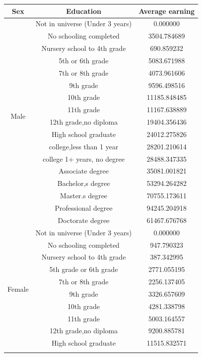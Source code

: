 \documentclass{article}
\begin{document}
\begin{table}[H]
  \centering
  \begin{tabular}{|c|c|c|}
  \hline
    Sex&Education&Average earning\\ \hline
    \multirow{16}{*}{Male}&Not in universe (Under 3 years)&0.000000\\ \hhline{~--} 
	&No schooling completed&3504.784689\\ \hhline{~--}
	&Nursery school to 4th grade&690.859232\\ \hhline{~--}
	&5th or 6th grade&5083.671988\\ \hhline{~--}
	&7th or 8th grade&4073.961606\\ \hhline{~--}
	&9th grade&9596.498516\\ \hhline{~--}
	&10th grade&11185.848485\\ \hhline{~--}
	&11th grade&11167.638889\\ \hhline{~--}
	&12th grade,no diploma&19404.356436\\ \hhline{~--}
	&High school graduate&24012.275826\\ \hhline{~--}
	&college,less than 1 year&28201.210614\\ \hhline{~--}
	&college 1+ years, no degree&28488.347335\\ \hhline{~--}
	&Associate degree&35081.001821\\ \hhline{~--}
	&Bachelor,s degree&53294.264282\\ \hhline{~--}
	&Master.s degree&70755.173611\\ \hhline{~--}
	&Professional degree&94245.204918\\ \hhline{~--}
	&Doctorate degree&61467.676768 \\\hline
    \multirow{16}{*}{Female}&Not in universe (Under 3 years)&0.000000\\ \hhline{~--}
	 &No schooling completed&947.790323\\ \hhline{~--} 
	 &Nursery school to 4th grade&387.342995\\ \hhline{~--} 
	 &5th grade or 6th grade&2771.055195\\ \hhline{~--} 
	 &7th or 8th grade&2256.137405\\ \hhline{~--} 
	 &9th grade&3326.657609\\ \hhline{~--} 
	 &10th grade&4281.338798\\ \hhline{~--} 
	 &11th grade&5003.164557\\ \hhline{~--} 
	 &12th grade,no diploma&9200.885781\\ \hhline{~--} 
	 &High school graduate&11515.832571\\ \hhline{~--} 

\end{tabular}
\end{table}
\end{document}
